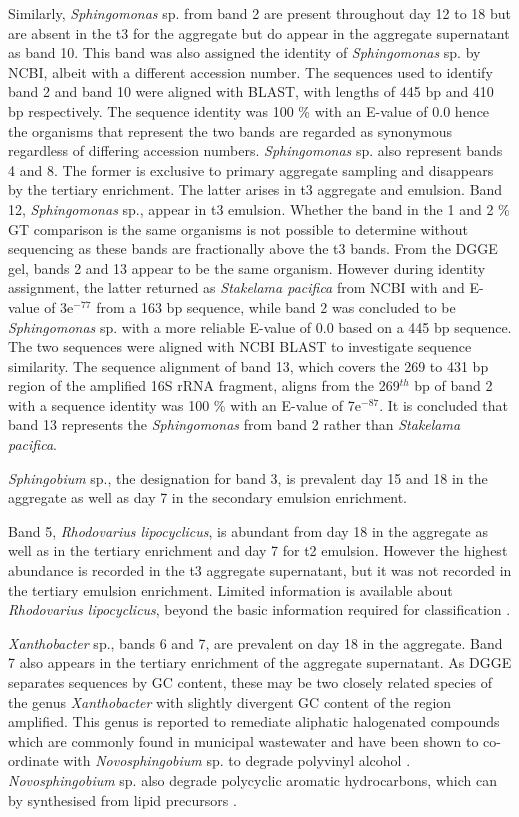 \documentclass[11pt]{article}
\begin{document}
Similarly, \emph{Sphingomonas} sp. from band 2 are present throughout day 12 to 18 but are absent in the t3 for the aggregate but do appear in the aggregate supernatant as band 10. This band was also assigned the identity of \emph{Sphingomonas} sp. by NCBI, albeit with a different accession number. The sequences used to identify band 2 and band 10 were aligned with BLAST, with lengths of 445 bp and 410 bp respectively. The sequence identity was 100 \% with an E-value of 0.0 hence the organisms that represent the two bands are regarded as synonymous regardless of differing accession numbers.
\emph{Sphingomonas} sp. also represent bands 4 and 8. The former is exclusive to primary aggregate sampling and disappears by the tertiary enrichment. The latter arises in t3 aggregate and emulsion.
Band 12, \emph{Sphingomonas} sp., appear in t3 emulsion. Whether the band in the 1 and 2 \% GT comparison is the same organisms is not possible to determine without sequencing as these bands are fractionally above the t3 bands.
From the DGGE gel, bands 2 and 13 appear to be the same organism. However during identity assignment, the latter returned as \emph{Stakelama pacifica} from NCBI with and E-value of 3e$^{-77}$ from a 163 bp sequence, while band 2 was concluded to be \emph{Sphingomonas} sp. with a more reliable E-value of 0.0 based on a 445 bp sequence. The two sequences were aligned with NCBI BLAST to investigate sequence similarity. The sequence alignment of band 13, which covers the 269 to 431 bp region of the amplified 16S rRNA fragment, aligns from the 269$^{th}$ bp of band 2 with a sequence identity was 100 \% with an E-value of 7e$^{-87}$. It is concluded that band 13 represents the \emph{Sphingomonas} from band 2 rather than \emph{Stakelama pacifica}.

\emph{Sphingobium} sp., the designation for band 3, is prevalent day 15 and 18 in the aggregate as well as day 7 in the secondary emulsion enrichment.


Band 5, \emph{Rhodovarius lipocyclicus}, is abundant from day 18 in the aggregate as well as in the tertiary enrichment and day 7 for t2 emulsion. However the highest abundance is recorded in the t3 aggregate supernatant, but it was not recorded in the tertiary emulsion enrichment. Limited information is available about \emph{Rhodovarius lipocyclicus}, beyond the basic information required for classification \cite{kampfer2004rhodovarius}.


\emph{Xanthobacter} sp., bands 6 and 7, are prevalent on day 18 in the aggregate. Band 7 also appears in the tertiary enrichment of the aggregate supernatant. As DGGE separates sequences by GC content, these may be two closely related species of the genus \emph{Xanthobacter} with slightly divergent GC content of the region amplified. This genus is reported to remediate aliphatic halogenated compounds which are commonly found in municipal wastewater \cite{janssen1985degradation} and have been shown to co-ordinate with \emph{Novosphingobium} sp. to degrade polyvinyl alcohol \cite{rong2009symbiotic}. \emph{Novosphingobium} sp. also degrade polycyclic aromatic hydrocarbons, which can by synthesised from lipid precursors \cite{addison2007novosphingobium}.
\end{document}
